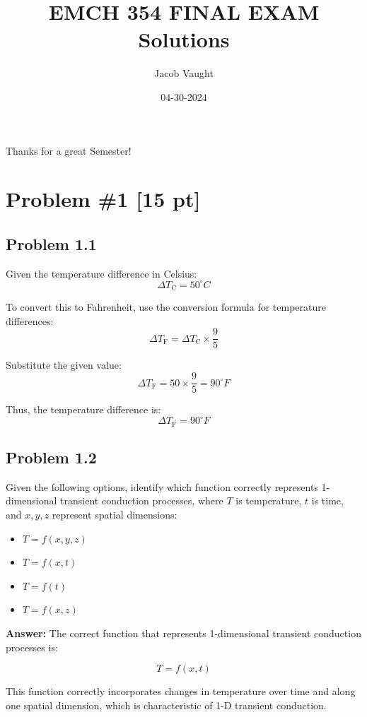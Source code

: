 \documentclass{article}
\title{EMCH 354 FINAL EXAM Solutions}
\author{Jacob Vaught}
\date{04-30-2024}
\begin{document}
\maketitle

Thanks for a great Semester! 

\section{Problem \#1 [15 pt]}
\subsection{Problem 1.1}
Given the temperature difference in Celsius:
\[ \Delta T_{\text{C}} = 50^{\circ}C \]

To convert this to Fahrenheit, use the conversion formula for temperature differences:
\[ \Delta T_{\text{F}} = \Delta T_{\text{C}} \times \frac{9}{5} \]

Substitute the given value:
\[ \Delta T_{\text{F}} = 50 \times \frac{9}{5} = 90^{\circ}F \]

Thus, the temperature difference is:
\[ \Delta T_{\text{F}} = 90^{\circ}F \]


\subsection{Problem 1.2}
Given the following options, identify which function correctly represents 1-dimensional transient conduction processes, where \( T \) is temperature, \( t \) is time, and \( x, y, z \) represent spatial dimensions:

\begin{itemize}
    \item[(a)] \( T = f(x, y, z) \) %
    \item[(b)] \( T = f(x, t) \) %
    \item[(c)] \( T = f(t) \) %
    \item[(d)] \( T = f(x, z) \) %
\end{itemize}

\textbf{Answer:} The correct function that represents 1-dimensional transient conduction processes is:

\[ T = f(x, t) \]

This function correctly incorporates changes in temperature over time and along one spatial dimension, which is characteristic of 1-D transient conduction.
\end{document}
